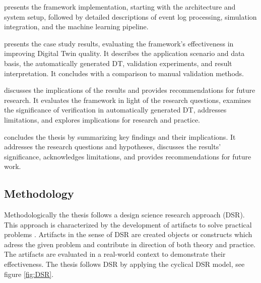  presents the framework implementation, starting with the architecture and system setup, followed by detailed descriptions of event log processing, simulation integration, and the machine learning pipeline.

 presents the case study results, evaluating the framework's effectiveness in improving Digital Twin quality. It describes the application scenario and data basis, the automatically generated DT, validation experiments, and result interpretation. It concludes with a comparison to manual validation methods.

 discusses the implications of the results and provides recommendations for future research. It evaluates the framework in light of the research questions, examines the significance of verification in automatically generated DT, addresses limitations, and explores implications for research and practice.

 concludes the thesis by summarizing key findings and their implications. It addresses the research questions and hypotheses, discusses the results' significance, acknowledges limitations, and provides recommendations for future work.

\subsection{Methodology}


Methodologically the thesis follows a design science research approach (DSR). This approach is characterized by the development of artifacts to solve practical problems \parencite{hevner2004design,peffers2007design}. Artifacts in the sense of DSR are created objects or constructs which adress the given problem and contribute in direction of both theory and practice. The artifacts are evaluated in a real-world context to demonstrate their effectiveness. The thesis follows DSR by applying the cyclical DSR model, see figure \ref{fig:DSR}.


